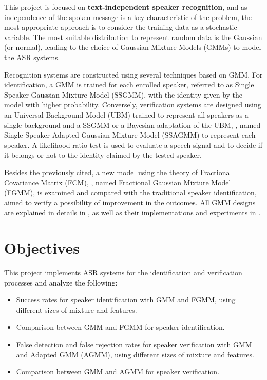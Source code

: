 This project is focused on \textbf{text-independent speaker recognition}, and as independence of the spoken message is a key characteristic of the problem, the most appropriate approach is to consider the training data as a stochastic variable. The most suitable distribution to represent random data is the Gaussian (or normal), leading to the choice of Gaussian Mixture Models (GMMs) to model the ASR systems.

Recognition systems are constructed using several techniques based on GMM. For identification, a GMM is trained for each enrolled speaker, referred to as Single Speaker Gaussian Mixture Model (SSGMM), with the identity given by the model with higher probability. Conversely, verification systems are designed using an Universal Background Model (UBM) trained to represent all speakers as a single background and a SSGMM or a Bayesian adaptation of the UBM, , named Single Speaker Adapted Gaussian Mixture Model (SSAGMM) to represent each speaker. A likelihood ratio test is used to evaluate a speech signal and to decide if it belongs or not to the identity claimed by the tested speaker.

Besides the previously cited, a new model using the theory of Fractional Covariance Matrix (FCM), , named Fractional Gaussian Mixture Model (FGMM), is examined and compared with the traditional speaker identification, aimed to verify a possibility of improvement in the outcomes. All GMM designs are explained in details in , as well as their implementations and experiments in .

\section{Objectives}

This project implements ASR systems for the identification and verification processes and analyze the following:

\begin{itemize}\itemsep0pt
    \item Success rates for speaker identification with GMM and FGMM, using different sizes of mixture and features.
    \item Comparison between GMM and FGMM for speaker identification.
    \item False detection and false rejection rates for speaker verification with GMM and Adapted GMM (AGMM), using different sizes of mixture and features.
    \item Comparison between GMM and AGMM for speaker verification.
\end{itemize}


